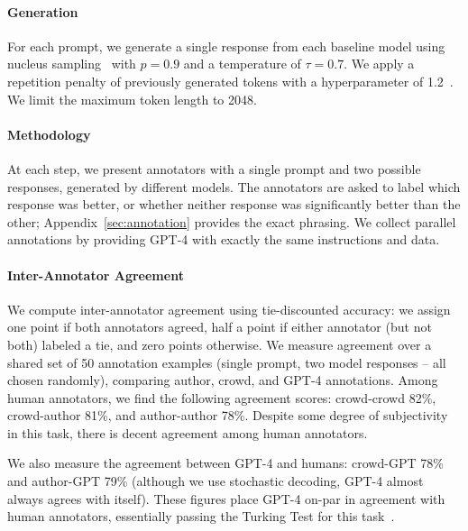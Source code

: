 \paragraph{Generation}
For each prompt, we generate a single response from each baseline model using nucleus sampling~\citep{holtzmancurious} with $p=0.9$ and a temperature of $\tau=0.7$. We apply a repetition penalty of previously generated tokens with a hyperparameter of 1.2~\citep{keskar2019ctrl}. We limit the maximum token length to 2048.

\paragraph{Methodology}
At each step, we present annotators with a single prompt and two possible responses, generated by different models.
The annotators are asked to label which response was better, or whether neither response was significantly better than the other; Appendix~\ref{sec:annotation} provides the exact phrasing.
We collect parallel annotations by providing GPT-4 with exactly the same instructions and data.

\paragraph{Inter-Annotator Agreement}
We compute inter-annotator agreement using tie-discounted accuracy: we assign one point if both annotators agreed, half a point if either annotator (but not both) labeled a tie, and zero points otherwise.
We measure agreement over a shared set of 50 annotation examples (single prompt, two model responses -- all chosen randomly), comparing author, crowd, and GPT-4 annotations.
Among human annotators, we find the following agreement scores: crowd-crowd 82\%, crowd-author 81\%, and author-author 78\%.
Despite some degree of subjectivity in this task, there is decent agreement among human annotators.

We also measure the agreement between GPT-4 and humans: crowd-GPT 78\% and author-GPT 79\% (although we use stochastic decoding, GPT-4 almost always agrees with itself).
These figures place GPT-4 on-par in agreement with human annotators, essentially passing the Turking Test for this task~\citep{efrat2020turking}.


